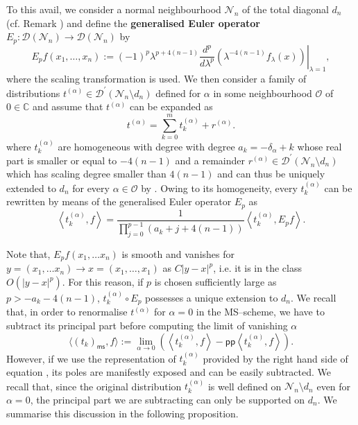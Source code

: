 \documentclass[10pt]{book}
\newcommand{\pp}{\mathsf{pp}}
\newcommand{\ms}{\mathsf{ms}}
\newcommand{\Dcal}{\mathcal{D}}
\newcommand{\Ncal}{\mathcal{N}}
\newcommand{\Ocal}{\mathcal{O}}
\theoremstyle{break}
\begin{document}
To this avail, we consider a normal neighbourhood $\Ncal_n$ of the total diagonal $d_n$ (cf. Remark %
) and define the {\bf generalised Euler operator} $E_p:\Dcal(\Ncal_n)\to\Dcal(\Ncal_n)$ by
%
\begin{equation}
E_p f (x_1,\dots, x_n) := (-1)^p \left. \lambda^{p+4(n-1)} \frac{d^p}{d\lambda^p}\left( \lambda^{-4(n-1)}  f_\lambda(x)\right)\right|_{\lambda = 1},
\end{equation}
%
where the scaling transformation %
is used. We then consider a family of distributions $t^{(\alpha)}\in \Dcal^\prime(\Ncal_n\setminus d_n)$ defined for $\alpha$ in some neighbourhood $\Ocal$ of $0\in \mathbb{C}$ and assume that $t^{(\alpha)}$ can be expanded as
%
\[
t^{(\alpha)}  = \sum_{k=0}^m t^{(\alpha)}_k + r^{(\alpha)}.
\]
%
where $t^{(\alpha)}_k$ are homogeneous with degree with degree $a_k=-\delta_\alpha+k$ whose real part is smaller or equal to $-4(n-1)$ and a remainder $r^{(\alpha)}\in \Dcal^\prime(\Ncal_n\setminus d_n)$ which has scaling degree smaller than $4(n-1)$ and can thus be uniquely extended to $d_n$ for every $\alpha\in \Ocal$ by %
. Owing to its homogeneity, every $t^{(\alpha)}_k$ can be rewritten by means of the generalised Euler operator $E_p$ as
\begin{equation}
\left\langle t^{(\alpha)}_k, f \right\rangle   =   \frac{1}{\prod_{j=0}^{p-1} (a_k+j+4(n-1))}   \left \langle t^{(\alpha)}_k, E_p f \right\rangle.
\end{equation}

Note that, $E_p f(x_1, \dots x_n)$ is smooth and vanishes for $y=(x_1, \dots x_n) \to x=(x_1, \dots, x_1)$ as $C|y-x|^p$, i.e. it is in the class $O(|y-x|^{p})$. For this reason, if  $p$ is chosen sufficiently large as $p > -a_k-4(n-1)$, $t^{(\alpha)}_k\circ E_p$ possesses a unique extension to $d_n$. We recall that, in order to renormalise $t^{(\alpha)}$ for $\alpha=0$ in the MS--scheme, we have to subtract its principal part before computing the limit of vanishing $\alpha$
\[
\langle (t_k)_\ms, f \rangle:=\lim_{\alpha\to 0 } \left(\left\langle t^{(\alpha)}_k, f \right\rangle - \pp \left\langle t^{(\alpha)}_k, f \right\rangle  \right).
\]
However, if we use the representation of $t^{(\alpha)}_k$ provided by the right hand side of equation %
, its poles are manifestly exposed and can be easily subtracted.
We recall that, since the original distribution $t^{(\alpha)}_k$ is well defined on $\Ncal_n\setminus d_n$ even for $\alpha=0$, the principal part we are subtracting can only be supported on $d_n$. We summarise this discussion in the following proposition.
\end{document}
